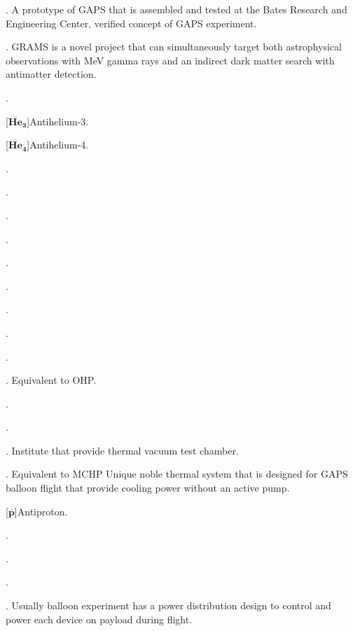\begin{acronym}
.
    A prototype of GAPS that is assembled and tested at the Bates Research and Engineering Center, verified concept of GAPS experiment.

. 
    GRAMS is a novel project that can simultaneously target both astrophysical observations with MeV gamma rays and an indirect dark matter search with antimatter detection.

.

[$\mathbf{\overline{He}_3}$]{Antihelium-3}.

[$\mathbf{\overline{He}_4}$]{Antihelium-4}.

.

.

.

.

.

.

.

.

.

. Equivalent to OHP.

.

.

. Institute that provide thermal vacuum test chamber.

. Equivalent to MCHP Unique noble thermal system that is designed for GAPS balloon flight that provide cooling power without an active pump.

[$\mathbf{\overline{p}}$]{Antiproton}.

.

.

.

. Usually balloon experiment has a power distribution design to control and power each device on payload during flight.


\end{acronym}
